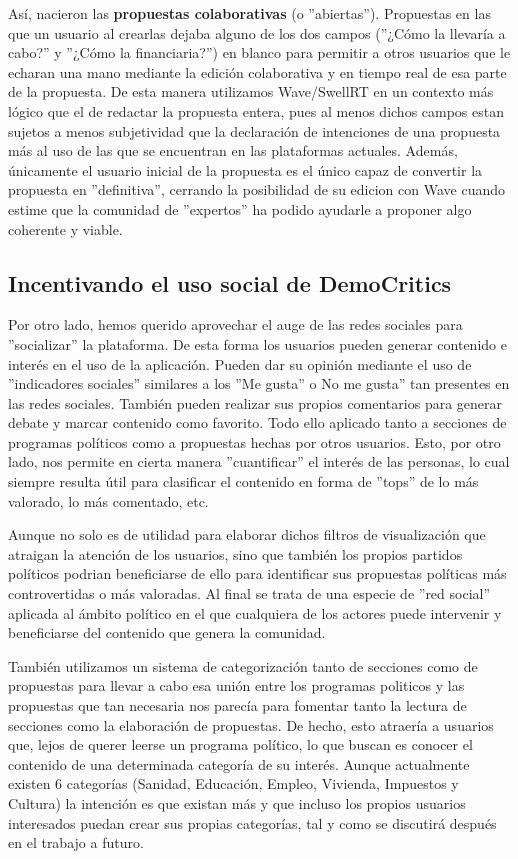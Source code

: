 Así, nacieron las \textbf{propuestas colaborativas} (o ''abiertas''). Propuestas en las que un usuario al crearlas dejaba alguno de los dos campos (''¿Cómo la llevaría a cabo?'' y ''¿Cómo la financiaria?'') en blanco para permitir a otros usuarios que le echaran una mano mediante la edición colaborativa y en tiempo real de esa parte de la propuesta. De esta manera utilizamos Wave/SwellRT en un contexto más lógico que el de redactar la propuesta entera, pues al menos dichos campos estan sujetos a menos subjetividad que la declaración de intenciones de una propuesta más al uso de las que se encuentran en las plataformas actuales. Además, únicamente el usuario inicial de la propuesta es el único capaz de convertir la propuesta en ''definitiva'', cerrando la posibilidad de su edicion con Wave cuando estime que la comunidad de ''expertos'' ha podido ayudarle a proponer algo coherente y viable. 


\subsection{Incentivando el uso social de DemoCritics}

Por otro lado, hemos querido aprovechar el auge de las redes sociales para ''socializar'' la plataforma. De esta forma los usuarios pueden generar contenido e interés en el uso de la aplicación. Pueden dar su opinión mediante el uso de ''indicadores sociales'' similares a los ''Me gusta'' o No me gusta'' tan presentes en las redes sociales. También pueden realizar sus propios comentarios para generar debate y marcar contenido como favorito. Todo ello aplicado tanto a secciones de programas políticos como a propuestas hechas por otros usuarios. Esto, por otro lado, nos permite en cierta manera ''cuantificar'' el interés de las personas, lo cual siempre resulta útil para clasificar el contenido en forma de ''tops'' de lo más valorado, lo más comentado, etc. 

Aunque no solo es de utilidad para elaborar dichos filtros de visualización que atraigan la atención de los usuarios, sino que también los propios partidos políticos podrian beneficiarse de ello para identificar sus propuestas políticas más controvertidas o más valoradas. Al final se trata de una especie de ''red social'' aplicada al ámbito político en el que cualquiera de los actores puede intervenir y beneficiarse del contenido que genera la comunidad. 

También utilizamos un sistema de categorización tanto de secciones como de propuestas para llevar a cabo esa unión entre los programas politicos y las propuestas que tan necesaria nos parecía para fomentar tanto la lectura de secciones como la elaboración de propuestas. De hecho, esto atraería a usuarios que, lejos de querer leerse un programa político, lo que buscan es conocer el contenido de una determinada categoría de su interés. Aunque actualmente existen 6 categorías (Sanidad, Educación, Empleo, Vivienda, Impuestos y Cultura) la intención es que existan más y que incluso los propios usuarios interesados puedan crear sus propias categorías, tal y como se discutirá después en el trabajo a futuro. 

